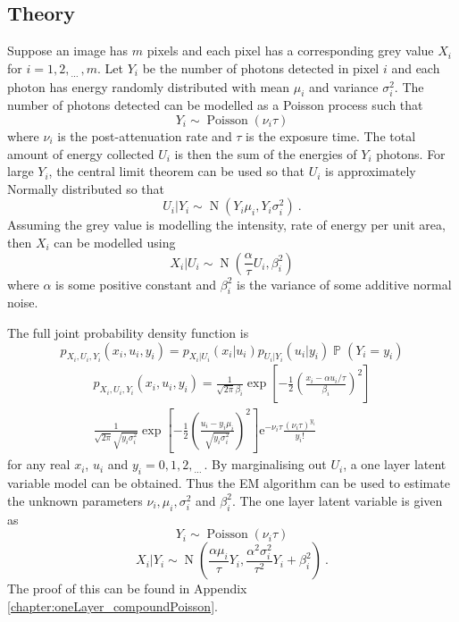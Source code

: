 \documentclass[12pt]{report}
\DeclareMathOperator{\prob}{\mathbb{P}}
\DeclareMathOperator{\normal}{N}
\DeclareMathOperator{\poisson}{Poisson}
\newcommand{\euler}{\mathrm{e}}
\newcommand{\dotdotdot}{_{\phantom{.}\cdots}}
\begin{document}
\subsection{Theory}
Suppose an image has $m$ pixels and each pixel has a corresponding grey value $X_i$ for $i=1,2,\dotdotdot,m$. Let $Y_i$ be the number of photons detected in pixel $i$ and each photon has energy randomly distributed with mean $\mu_i$ and variance $\sigma_i^2$. The number of photons detected can be modelled as a Poisson process such that
\begin{equation}
Y_i\sim\poisson(\nu_i \tau)
\end{equation}
where $\nu_i$ is the post-attenuation rate and $\tau$ is the exposure time. The total amount of energy collected $U_i$ is then the sum of the energies of $Y_i$ photons. For large $Y_i$, the central limit theorem can be used so that $U_i$ is approximately Normally distributed so that
\begin{equation}
U_i|Y_i\sim\normal\left(
Y_i\mu_i,Y_i\sigma_i^2
\right) \ .
\end{equation}
Assuming the grey value is modelling the intensity, rate of energy per unit area, then $X_i$ can be modelled using
\begin{equation}
X_i|U_i\sim\normal\left(
\frac{\alpha}{\tau}U_i,\beta_i^2
\right)
\end{equation}
where $\alpha$ is some positive constant and $\beta_i^2$ is the variance of some additive normal noise.
 
The full joint probability density function is
\begin{equation*}
p_{X_i,U_i,Y_i}\left(x_i,u_i,y_i\right)=
p_{X_i|U_i}(x_i|u_i)p_{U_i|Y_i}(u_i|y_i)\prob(Y_i=y_i)
\end{equation*}
\begin{multline}
p_{X_i,U_i,Y_i}\left(x_i,u_i,y_i\right)=
\frac{1}{\sqrt{2\pi}\beta_i}\exp\left[-\frac{1}{2}\left(\frac{x_i-\alpha u_i /\tau}{\beta_i}\right)^2\right]
\\
\frac{1}{\sqrt{2\pi}\sqrt{y_i\sigma_i^2}}\exp\left[-\frac{1}{2}\left(\frac{u_i-y_i\mu_i}{\sqrt{y_i\sigma_i^2}}\right)^2\right]
\euler^{-\nu_i\tau}\frac{(\nu_i\tau)^{y_i}}{y_i!}
\end{multline}
for any real $x_i$, $u_i$ and $y_i=0,1,2,\dotdotdot$.
By marginalising out $U_i$, a one layer latent variable model can be obtained. Thus the EM algorithm \cite[pp.~260-261]{barber2012bayesian} can be used to estimate the unknown parameters $\nu_i,\mu_i,\sigma_i^2$ and $\beta_i^2$. The one layer latent variable is given as
\begin{equation}
Y_i\sim\poisson(\nu_i\tau)
\end{equation}
\begin{equation}
X_i|Y_i\sim\normal\left(
\frac{\alpha\mu_i}{\tau}Y_i,\frac{\alpha^2\sigma_i^2}{\tau^2}Y_i+\beta_i^2
\right) \ .
\end{equation}
The proof of this can be found in Appendix \ref{chapter:oneLayer_compoundPoisson}.
\end{document}

